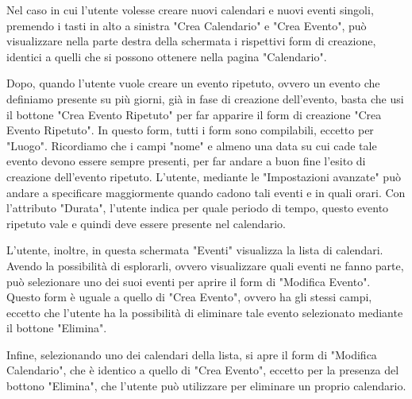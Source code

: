 Nel caso in cui l'utente volesse creare nuovi calendari e nuovi eventi singoli, premendo i tasti in alto a sinistra "Crea Calendario" e "Crea Evento", può visualizzare nella parte destra della schermata i rispettivi form di creazione, identici a quelli che si possono ottenere nella pagina "Calendario".

Dopo, quando l'utente vuole creare un evento ripetuto, ovvero un evento che definiamo presente su più giorni, già in fase di creazione dell'evento, basta che usi il bottone "Crea Evento Ripetuto" per far apparire il form di creazione "Crea Evento Ripetuto". In questo form, tutti i form sono compilabili, eccetto per "Luogo". Ricordiamo che i campi "nome" e almeno una data su cui cade tale evento devono essere sempre presenti, per far andare a buon fine l'esito di creazione dell'evento ripetuto. L'utente, mediante le "Impostazioni avanzate" può andare a specificare maggiormente quando cadono tali eventi e in quali orari. Con l'attributo "Durata", l'utente indica per quale periodo di tempo, questo evento ripetuto vale e quindi deve essere presente nel calendario.

L'utente, inoltre, in questa schermata "Eventi" visualizza la lista di calendari. Avendo la possibilità di esplorarli, ovvero visualizzare quali eventi ne fanno parte, può selezionare uno dei suoi eventi per aprire il form di "Modifica Evento". Questo form è uguale a quello di "Crea Evento", ovvero ha gli stessi campi, eccetto che l'utente ha la possibilità di eliminare tale evento selezionato mediante il bottone "Elimina".


Infine, selezionando uno dei calendari della lista, si apre il form di "Modifica Calendario", che è identico a quello di "Crea Evento", eccetto per la presenza del bottono "Elimina", che l'utente può utilizzare per eliminare un proprio calendario.